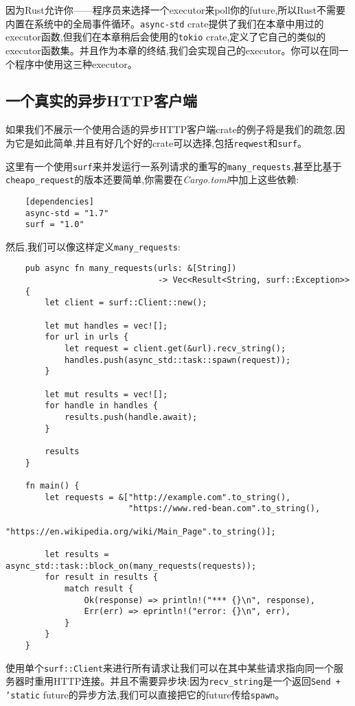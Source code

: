 因为Rust允许你——程序员来选择一个executor来poll你的future,所以Rust不需要内置在系统中的全局事件循环。\texttt{async-std} crate提供了我们在本章中用过的executor函数,但我们在本章稍后会使用的\texttt{tokio} crate,定义了它自己的类似的executor函数集。并且作为本章的终结,我们会实现自己的executor。你可以在同一个程序中使用这三种executor。

\subsection{一个真实的异步HTTP客户端}
如果我们不展示一个使用合适的异步HTTP客户端crate的例子将是我们的疏忽,因为它是如此简单,并且有好几个好的crate可以选择,包括\texttt{reqwest}和\texttt{surf}。

这里有一个使用\texttt{surf}来并发运行一系列请求的重写的\texttt{many\_requests},甚至比基于\texttt{cheapo\_request}的版本还要简单,你需要在\emph{Cargo.toml}中加上这些依赖:
\begin{verbatim}
    [dependencies]
    async-std = "1.7"
    surf = "1.0"
\end{verbatim}

然后,我们可以像这样定义\texttt{many\_requests}:
\begin{verbatim}
    pub async fn many_requests(urls: &[String])
                               -> Vec<Result<String, surf::Exception>>
    {
        let client = surf::Client::new();

        let mut handles = vec![];
        for url in urls {
            let request = client.get(&url).recv_string();
            handles.push(async_std::task::spawn(request));
        }

        let mut results = vec![];
        for handle in handles {
            results.push(handle.await);
        }

        results
    }

    fn main() {
        let requests = &["http://example.com".to_string(),
                         "https://www.red-bean.com".to_string(),
                         "https://en.wikipedia.org/wiki/Main_Page".to_string()];

        let results = async_std::task::block_on(many_requests(requests));
        for result in results {
            match result {
                Ok(response) => println!("*** {}\n", response),
                Err(err) => eprintln!("error: {}\n", err),
            }
        }
    }
\end{verbatim}

使用单个\texttt{surf::Client}来进行所有请求让我们可以在其中某些请求指向同一个服务器时重用HTTP连接。并且不需要异步块:因为\texttt{recv\_string}是一个返回\texttt{Send + 'static} future的异步方法,我们可以直接把它的future传给\texttt{spawn}。

